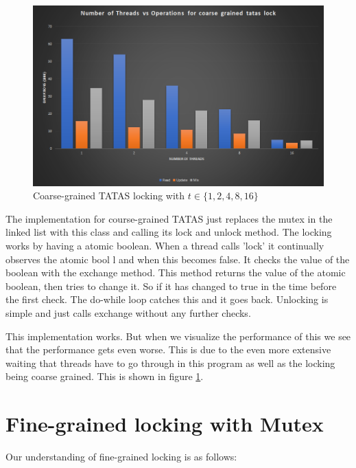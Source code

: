 \begin{figure}
    \centering
    \includegraphics[width=\linewidth]{Figures/coarsegrainedtatas.png}
    \caption{Coarse-grained TATAS locking with $t \in \{1, 2, 4, 8, 16\}$}
    \label{fig:coarsegrainedtatas}
\end{figure}


The implementation for course-grained TATAS just replaces the mutex in the
linked list with this class and calling its lock and unlock method.
The locking works by having a atomic boolean. When a thread calls 'lock'
it continually observes the atomic bool l and when this becomes false. It checks
the value of the boolean with the exchange method. This method returns the value
of the atomic boolean, then tries to change it. So if it has changed to true
in the time before the first check. The do-while loop catches this and it goes 
back. Unlocking is simple and just calls exchange without any further checks.

This implementation works. But when we visualize the performance of this we see
that the performance gets even worse. This is due to the even more extensive 
waiting that threads have to go through in this program as well as the locking
being coarse grained. This is shown in figure \ref{fig:coarsegrainedtatas}.

\section{Fine-grained locking with Mutex}

Our understanding of fine-grained locking is as follows:

